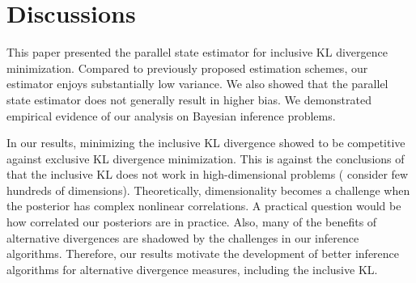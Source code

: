
\vspace{-0.15in}
\section{Discussions}\label{section:discussion}
\vspace{-0.1in}
This paper presented the parallel state estimator for inclusive KL divergence minimization.
Compared to previously proposed estimation schemes, our estimator enjoys substantially low variance.
We also showed that the parallel state estimator does not generally result in higher bias.
We demonstrated empirical evidence of our analysis on Bayesian inference problems.

In our results, minimizing the inclusive KL divergence showed to be competitive against exclusive KL divergence minimization.
This is against the conclusions of~\citet{dhaka_challenges_2021} that the inclusive KL does not work in high-dimensional problems (\citeauthor{dhaka_challenges_2021} consider few hundreds of dimensions).
Theoretically, dimensionality becomes a challenge when the posterior has complex nonlinear correlations.
A practical question would be how correlated our posteriors are in practice.
Also, many of the benefits of alternative divergences are shadowed by the challenges in our inference algorithms.
Therefore, our results motivate the development of better inference algorithms for alternative divergence measures, including the inclusive KL. 


